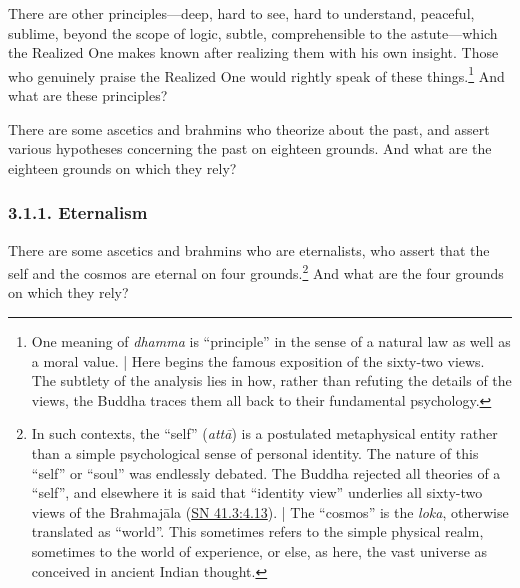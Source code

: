 \documentclass[12pt,openany]{book}%
\begin{document}
There are other principles—deep, hard to see, hard to understand, peaceful, sublime, beyond the scope of logic, subtle, comprehensible to the astute—which the Realized One makes known after realizing them with his own insight. Those who genuinely praise the Realized One would rightly speak of these things.\footnote{One meaning of \textit{dhamma} is “principle” in the sense of a natural law as well as a moral value. | Here begins the famous exposition of the sixty-two views. The subtlety of the analysis lies in how, rather than refuting the details of the views, the Buddha traces them all back to their fundamental psychology. } And what are these principles? 

There are some ascetics and brahmins who theorize about the past, and assert various hypotheses concerning the past on eighteen grounds. And what are the eighteen grounds on which they rely? 

\subsubsection*{3.1.1. Eternalism }

There are some ascetics and brahmins who are eternalists, who assert that the self and the cosmos are eternal on four grounds.\footnote{In such contexts, the “self” (\textit{\textsanskrit{attā}}) is a postulated metaphysical entity rather than a simple psychological sense of personal identity. The nature of this “self” or “soul” was endlessly debated. The Buddha rejected all theories of a “self”, and elsewhere it is said that “identity view” underlies all sixty-two views of the \textsanskrit{Brahmajāla} (\href{https://suttacentral.net/sn41.3/en/sujato\#4.13}{SN 41.3:4.13}). | The “cosmos” is the \textit{loka}, otherwise translated as “world”. This sometimes refers to the simple physical realm, sometimes to the world of experience, or else, as here, the vast universe as conceived in ancient Indian thought. } And what are the four grounds on which they rely? 
\end{document}

